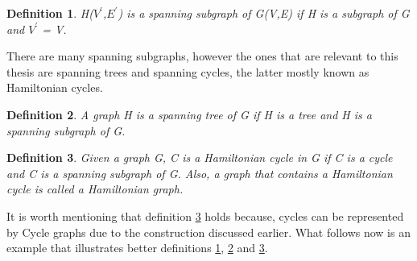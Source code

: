 \documentclass{article}
\newtheorem{definition}{Definition}[subsection]
\begin{document}
\begin{definition}
\label{spanning subgraph}
H($V^\prime$,$E^\prime$) is a spanning subgraph of G(V,E) if H is a subgraph of G and $V^\prime$ = V. 
\end{definition}
There are many spanning subgraphs, however the ones that are relevant to this thesis are spanning trees and spanning cycles, the latter mostly known as Hamiltonian cycles.
\begin{definition}
A graph H is a spanning tree of G if H is a tree and H is a spanning subgraph of G. 
\label{spanning tree}
\end{definition}
\begin{definition}
\label{hamiltonian cycle}
Given a graph G, C is a Hamiltonian cycle in G if C is a cycle and C is a spanning subgraph of G. Also, a graph that contains a Hamiltonian cycle is called a Hamiltonian graph. 
\end{definition}
It is worth mentioning that definition \ref{hamiltonian cycle} holds because, cycles can be represented by Cycle graphs due to the construction discussed earlier. What follows now is an example that illustrates better definitions \ref{spanning subgraph}, \ref{spanning tree} and \ref{hamiltonian cycle}. 
\end{document}
